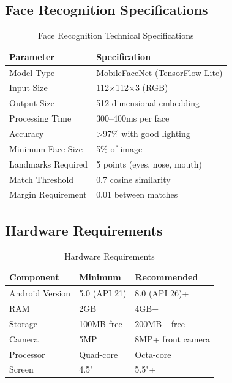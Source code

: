 \documentclass[12pt,a4paper]{article}
\begin{document}
\subsection{Face Recognition Specifications}
\begin{table}[H]
\centering
\small
\begin{tabularx}{\textwidth}{|l|X|}
\hline
\rowcolor{lightgray}
\textbf{Parameter} & \textbf{Specification} \\
\hline
Model Type & MobileFaceNet (TensorFlow Lite) \\
\hline
Input Size & 112×112×3 (RGB) \\
\hline
Output Size & 512-dimensional embedding \\
\hline
Processing Time & 300--400ms per face \\
\hline
Accuracy & >97\% with good lighting \\
\hline
Minimum Face Size & 5\% of image \\
\hline
Landmarks Required & 5 points (eyes, nose, mouth) \\
\hline
Match Threshold & 0.7 cosine similarity \\
\hline
Margin Requirement & 0.01 between matches \\
\hline
\end{tabularx}
\caption{Face Recognition Technical Specifications}
\end{table}

\subsection{Hardware Requirements}
\begin{table}[H]
\centering
\small
\begin{tabularx}{\textwidth}{|l|X|X|}
\hline
\rowcolor{lightgray}
\textbf{Component} & \textbf{Minimum} & \textbf{Recommended} \\
\hline
Android Version & 5.0 (API 21) & 8.0 (API 26)+ \\
\hline
RAM & 2GB & 4GB+ \\
\hline
Storage & 100MB free & 200MB+ free \\
\hline
Camera & 5MP & 8MP+ front camera \\
\hline
Processor & Quad-core & Octa-core \\
\hline
Screen & 4.5" & 5.5"+ \\
\hline
\end{tabularx}
\caption{Hardware Requirements}
\end{table}
\end{document}
